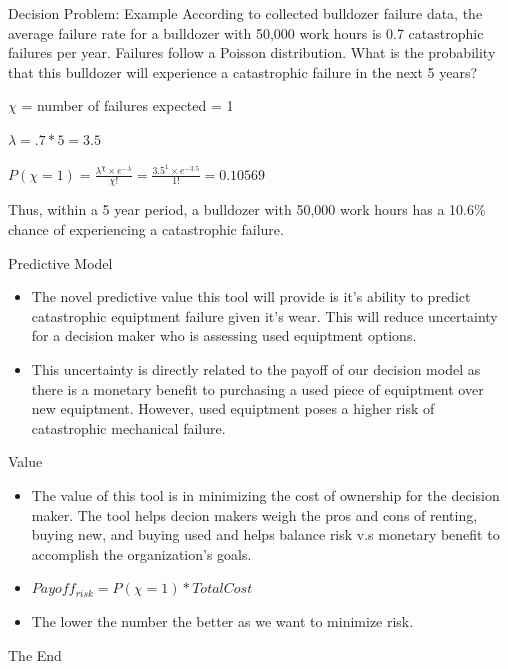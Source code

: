\documentclass[
  ignorenonframetext,
]{beamer}
\begin{document}
\begin{frame}{Decision Problem: Example}
\protect\hypertarget{decision-problem-example}{}
According to collected bulldozer failure data, the average failure rate
for a bulldozer with 50,000 work hours is 0.7 catastrophic failures per
year. Failures follow a Poisson distribution. What is the probability
that this bulldozer will experience a catastrophic failure in the next 5
years?

\(\chi\) = number of failures expected = 1

\(\lambda = .7 * 5 = 3.5\)

\(P(\chi = 1) = \frac{\lambda^{\chi} \times e^{-\lambda}}{\chi !} = \frac{3.5^{1} \times e^{-3.5}}{1!} = 0.10569\)

Thus, within a 5 year period, a bulldozer with 50,000 work hours has a
10.6\% chance of experiencing a catastrophic failure.
\end{frame}

\begin{frame}{Predictive Model}
\protect\hypertarget{predictive-model}{}
\begin{itemize}
\item
  The novel predictive value this tool will provide is it's ability to
  predict catastrophic equiptment failure given it's wear. This will
  reduce uncertainty for a decision maker who is assessing used
  equiptment options.
\item
  This uncertainty is directly related to the payoff of our decision
  model as there is a monetary benefit to purchasing a used piece of
  equiptment over new equiptment. However, used equiptment poses a
  higher risk of catastrophic mechanical failure.
\end{itemize}
\end{frame}

\begin{frame}{Value}
\protect\hypertarget{value}{}
\begin{itemize}
\item
  The value of this tool is in minimizing the cost of ownership for the
  decision maker. The tool helps decion makers weigh the pros and cons
  of renting, buying new, and buying used and helps balance risk v.s
  monetary benefit to accomplish the organization's goals.
\item
  \(Payoff_{risk} = P(\chi = 1) * TotalCost\)
\item
  The lower the number the better as we want to minimize risk.
\end{itemize}
\end{frame}

\begin{frame}{The End}
\protect\hypertarget{the-end}{}
\end{frame}
\end{document}
